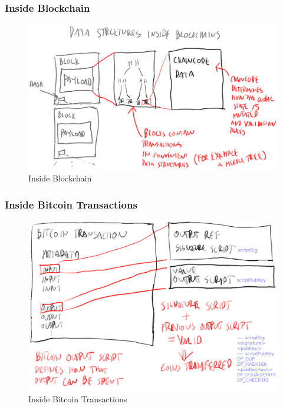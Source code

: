 \documentclass[8pt]{beamer}
\begin{document}
\begin{frame}
\frametitle{Inside Blockchain}

\begin{figure}[tb]
 \centering
 \includegraphics[width=8 cm,keepaspectratio=true]{./blockchain_images/inside_blockchains.png}
 \caption{Inside Blockchain}
\end{figure}

\end{frame}

\begin{frame}
\frametitle{Inside Bitcoin Transactions}

\begin{figure}[tb]
 \centering
 \includegraphics[width=10 cm,keepaspectratio=true]{./blockchain_images/bitcoin_transactions.png}
 \caption{Inside Bitcoin Transactions}
\end{figure}

\end{frame}
\end{document}
